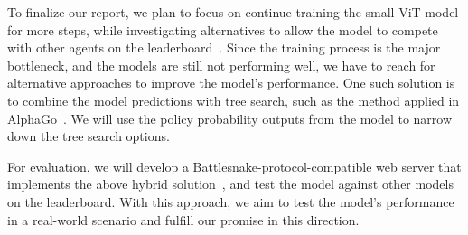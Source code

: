 \documentclass[conference]{IEEEtran}
\newcommand{\todo}[1]{\textcolor{red}{[ #1 ]}}
\renewcommand{\todo}[1]{} %
\begin{document}
\todo{The plan for finalizing your final report.}

To finalize our report, we plan to focus on continue training the small ViT model for more steps,
while investigating alternatives to allow the model to compete with other agents
on the leaderboard~\cite{standard_leaderboard}.
Since the training process is the major bottleneck,
and the models are still not performing well,
we have to reach for alternative approaches to improve the model's performance.
One such solution is to combine the model predictions with tree search,
such as the method applied in AlphaGo~\cite{silver2016mastering}.
We will use the policy probability outputs from the model to narrow down the
tree search options.

For evaluation,
we will develop a Battlesnake-protocol-compatible web server that implements the
above hybrid solution~\cite{battlesnake},
and test the model against other models on the leaderboard. With this approach,
we aim to test the model's performance in a real-world scenario and fulfill our
promise in this direction.

\printbibliography
\end{document}
